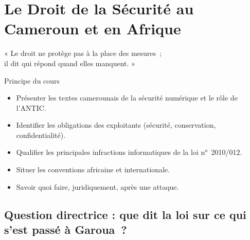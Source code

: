 
\chapter{Le Droit de la Sécurité au Cameroun et en Afrique}
\label{chap:droit}

\epigraph{%
    « Le droit ne protège pas à la place des mesures~;\\
    il dit qui répond quand elles manquent. »%
}{Principe du cours}


\begin{boxobjectifs}
\begin{itemize}
    \item Présenter les textes camerounais de la sécurité numérique et le
          rôle de l'ANTIC.
    \item Identifier les obligations des exploitants (sécurité,
          conservation, confidentialité).
    \item Qualifier les principales infractions informatiques de la loi
          n°~2010/012.
    \item Situer les conventions africaine et internationale.
    \item Savoir quoi faire, juridiquement, après une attaque.
\end{itemize}
\end{boxobjectifs}

\bigskip

\section*{Question directrice : que dit la loi sur ce qui s'est passé à Garoua~?}

